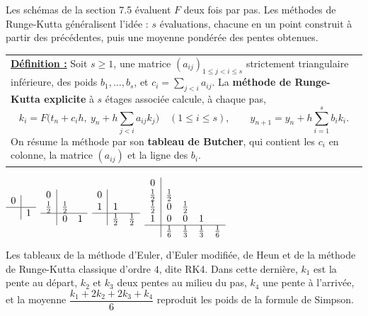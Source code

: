 \documentclass[a4paper,twoside]{report}
\newcommand{\mot}[1]{\textcolor{rougecours}{\textbf{#1}}}
\begin{document}
Les schémas de la section 7.5 évaluent $F$ deux fois par pas. Les méthodes de Runge-Kutta généralisent l'idée : $s$ évaluations, chacune en un point construit à partir des précédentes, puis une moyenne pondérée des pentes obtenues.

\begin{center}
\begin{tabularx}{15cm}{||X}
\noindent \textbf{\underline{Définition :}} Soit $s \geqslant 1$, une matrice $(a_{ij})_{1 \leqslant j < i \leqslant s}$ strictement triangulaire inférieure, des poids $b_{1}, \dots, b_{s}$, et $c_{i} = \displaystyle\sum_{j < i} a_{ij}$. La \mot{méthode de Runge-Kutta explicite} à $s$ étages associée calcule, à chaque pas,
\[ k_{i} = F\Big(t_{n} + c_{i}h,\ y_{n} + h\sum_{j < i} a_{ij}k_{j}\Big) \quad (1 \leqslant i \leqslant s), \qquad y_{n + 1} = y_{n} + h\sum_{i = 1}^{s} b_{i}k_{i}. \]
On résume la méthode par son \mot{tableau de Butcher}, qui contient les $c_{i}$ en colonne, la matrice $(a_{ij})$ et la ligne des $b_{i}$.
\end{tabularx}
\end{center}

\begin{center}
\renewcommand{\arraystretch}{1.25}
$\begin{array}{c|c} 0 & \\ \hline & 1 \end{array}$
\qquad\qquad
$\begin{array}{c|cc} 0 & & \\ \frac{1}{2} & \frac{1}{2} & \\ \hline & 0 & 1 \end{array}$
\qquad\qquad
$\begin{array}{c|cc} 0 & & \\ 1 & 1 & \\ \hline & \frac{1}{2} & \frac{1}{2} \end{array}$
\qquad\qquad
$\begin{array}{c|cccc} 0 & & & & \\ \frac{1}{2} & \frac{1}{2} & & & \\ \frac{1}{2} & 0 & \frac{1}{2} & & \\ 1 & 0 & 0 & 1 & \\ \hline & \frac{1}{6} & \frac{1}{3} & \frac{1}{3} & \frac{1}{6} \end{array}$
\end{center}

\noindent Les tableaux de la méthode d'Euler, d'Euler modifiée, de Heun et de la méthode de Runge-Kutta classique d'ordre $4$, dite RK4. Dans cette dernière, $k_{1}$ est la pente au départ, $k_{2}$ et $k_{3}$ deux pentes au milieu du pas, $k_{4}$ une pente à l'arrivée, et la moyenne $\dfrac{k_{1} + 2k_{2} + 2k_{3} + k_{4}}{6}$ reproduit les poids de la formule de Simpson.
\end{document}
